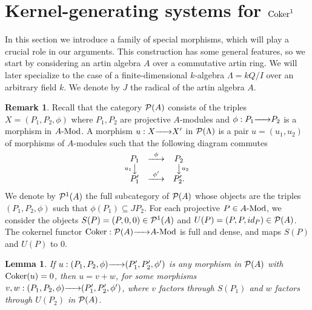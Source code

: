 \documentclass{article}
\newtheorem{lemma}[theorem]{Lemma}
\theoremstyle{definition}
\newtheorem{remark}[theorem]{Remark}
\newcommand{\Coker}{{ \rm Coker }}
\newcommand{\Mod}{{ \rm Mod }}
\newcommand{\g}{\hbox{-}}
\newcommand{\rightmap}[1]{\smash{\mathop{\hbox to 
20pt{\rightarrowfill}}\limits^{#1}}}
\newcommand{\shortlmapdown}[1]
{\llap{$\vcenter{\hbox{$\scriptstyle#1$}}$}\big\downarrow}
\newcommand{\shortrmapdown}[1]
{\big\downarrow\rlap{$\vcenter{\hbox{$\scriptstyle#1$}}$}}
\begin{document}
 

\section{Kernel-generating systems for $\Coker^1$}
  In this section we introduce a family of special morphisms, which will play a crucial role in our arguments.  This construction has some general features, so we start by considering  an artin algebra $A$  over a commutative artin ring. We will later specialize to the case of a finite-dimensional $k$-algebra  $\Lambda=kQ/I$ over an arbitrary field $k$.   We denote by $J$ the radical of the artin algebra $A$.  
   
   \begin{remark} Recall that the category ${\cal P}(A)$ consists of the triples $X=(P_1,P_2,\phi)$ where $P_1,P_2$ are projective $A$-modules and $\phi:P_1\rightmap{} P_2$ is a morphism in $A\g\Mod$. A morphism $u:X\rightmap{}X'$ in ${\cal P}(\Lambda)$ is a pair $u=(u_1,u_2)$ of morphisms of $A$-modules such that the following diagram commutes
$$\begin{matrix}P_1&\rightmap{\phi}&P_2\\
\shortlmapdown{u_1}&&\shortrmapdown{u_2}\\
P'_1&\rightmap{\phi'}&P'_2.\\
\end{matrix}$$  
We denote by ${\cal P}^1(A)$ the full subcategory of ${\cal P}(A)$ whose objects are the triples $(P_1,P_2,\phi)$ such that $\phi(P_1)\subseteq JP_2$. 
For each projective $P\in A\g\Mod$, we consider the objects $S(P)=(P,0,0)\in {\cal P}^1(A)$ and $U(P)=(P,P,id_P)\in {\cal P}(A)$. The cokernel functor $\Coker:{\cal P}(A)\rightmap{}A\g\Mod$ is full and dense, and maps $S(P)$ and $U(P)$ to $0$. 
\end{remark}

\begin{lemma}\label{L: facts en P(Lambda)}
If $u : (P_1,P_2,\phi)\rightmap{}(P'_1,P'_2,\phi')$ is any morphism in ${\cal P}(A)$ with $\Coker(u) = 0$, then $u = v + w$, for some morphisms $v, w : (P_1,P_2,\phi)\rightmap{}(P'_1,P'_2,\phi')$, where $v$ factors through  $S(P_1)$ and $w$ factors through  $U(P_2)$ in ${\cal P}(A)$. 
\end{lemma}
\end{document}
